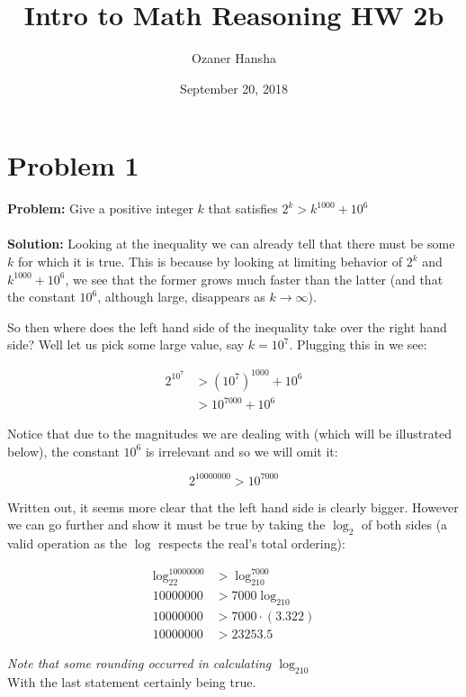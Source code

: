\documentclass{article}
\begin{document}
\title{Intro to Math Reasoning HW 2b}
\author{Ozaner Hansha}
\date{September 20, 2018}
\maketitle

\section{Problem 1}
\textbf{Problem:} Give a positive integer $k$ that satisfies $2^k> k^{1000} + 10^6$
\\\\
\textbf{Solution:} Looking at the inequality we can already tell that there must be some $k$ for which it is true. This is because by looking at limiting behavior of $2^k$ and $k^{1000}+10^6$, we see that the former grows much faster than the latter (and that the constant $10^6$, although large, disappears as $k\to\infty$).

So then where does the left hand side of the inequality take over the right hand side? Well let us pick some large value, say $k=10^7$. Plugging this in we see:

\begin{align*}
2^{10^7}&>(10^7)^{1000}+10^6\\
&>10^{7000}+10^6
\end{align*}

Notice that due to the magnitudes we are dealing with (which will be illustrated below), the constant $10^6$ is irrelevant and so we will omit it:

$$2^{10000000}>10^{7000}$$

Written out, it seems more clear that the left hand side is clearly bigger. However we can go further and show it must be true by taking the $\log_2$ of both sides (a valid operation as the $\log$ respects the real's total ordering):

\begin{align*}
\log_22^{10000000}&>\log_210^{7000}\\
10000000&>7000\log_210\\
10000000&>7000\cdot(3.322)\\
10000000&>23253.5
\end{align*}

\textit{Note that some rounding occurred in calculating $\log_210$}\\

With the last statement certainly being true.
\end{document}

